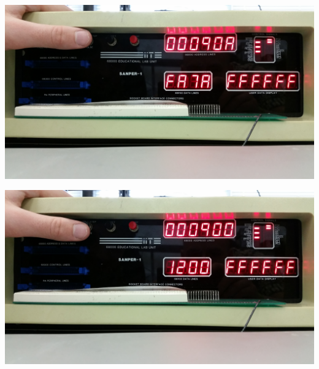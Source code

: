 \documentclass[12pt, twocolumn]{article}
\begin{document}
\begin{center}
\includegraphics[width=1\linewidth]{Lab1/20150120_094151}
\end{center}
\begin{center}
\includegraphics[width=1\linewidth]{Lab1/20150120_094154}
\end{center}
\end{document}
